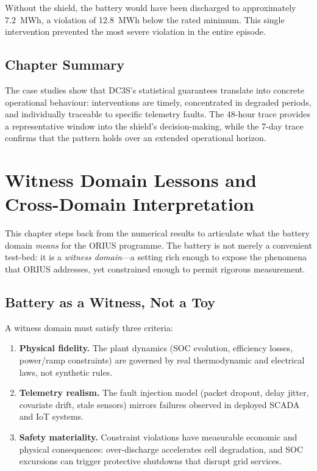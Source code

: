 Without the shield, the battery would have been discharged to approximately
7.2~MWh, a violation of 12.8~MWh below the rated minimum.  This single
intervention prevented the most severe violation in the entire episode.

\subsection{Chapter Summary}

The case studies show that DC3S's statistical guarantees translate into
concrete operational behaviour: interventions are timely, concentrated in
degraded periods, and individually traceable to specific telemetry faults.
The 48-hour trace provides a representative window into the shield's
decision-making, while the 7-day trace confirms that the pattern holds
over an extended operational horizon.



\section{Witness Domain Lessons and Cross-Domain Interpretation}
\label{ch:battery-lessons}

This chapter steps back from the numerical results to articulate what the
battery domain \emph{means} for the ORIUS programme.  The battery is not
merely a convenient test-bed: it is a \emph{witness domain}---a setting
rich enough to expose the phenomena that ORIUS addresses, yet constrained
enough to permit rigorous measurement.

\subsection{Battery as a Witness, Not a Toy}

A witness domain must satisfy three criteria:
\begin{enumerate}
  \item \textbf{Physical fidelity.}  The plant dynamics (SOC evolution,
    efficiency losses, power/ramp constraints) are governed by real
    thermodynamic and electrical laws, not synthetic rules.
  \item \textbf{Telemetry realism.}  The fault injection model
    (packet dropout, delay jitter, covariate drift, stale sensors)
    mirrors failures observed in deployed SCADA and IoT systems.
  \item \textbf{Safety materiality.}  Constraint violations have
    measurable economic and physical consequences: over-discharge
    accelerates cell degradation, and SOC excursions can trigger
    protective shutdowns that disrupt grid services.
\end{enumerate}

